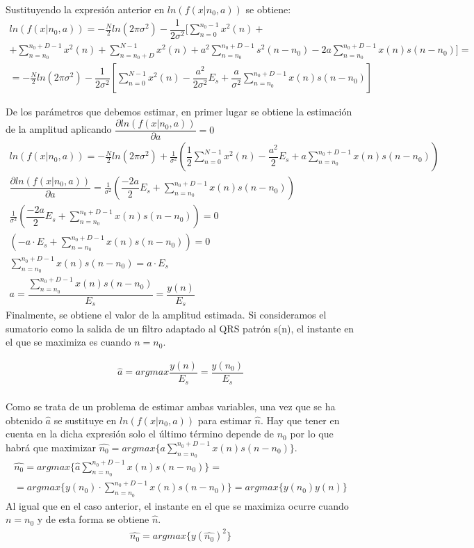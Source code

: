 \documentclass[12pt]{article}
\begin{document}
Sustituyendo la expresión anterior en $ln(f(x|n_0,a))$ se obtiene:
\begin{gather*}
ln(f(x|n_0,a)) = - \frac{N}{2}ln(2\pi\sigma^2) -\dfrac{1}{2\sigma^2} [ \sum_{n=0}^{n_0-1}x^2(n) + \\
+\sum_{n=n_0}^{n_0+D-1}x^2(n) + \sum_{n=n_0+D}^{N-1}x^2(n) + a^2\sum_{n=n_0}^{n_0+D-1}s^2(n-n_0) - 2a\sum_{n=n_0}^{n_0+D-1}x(n)s(n-n_0) ] =\\
=- \frac{N}{2}ln(2\pi\sigma^2) - \dfrac{1}{2\sigma ^2} \left[ \sum_{n=0}^{N-1}x^2(n) - \dfrac{a^2}{2\sigma^2}E_s + \dfrac{a}{\sigma^2}\sum_{n=n_0}^{n_0+D-1}x(n)s(n-n_0)\right] 
\end{gather*}

De los parámetros que debemos estimar, en primer lugar se obtiene la estimación de la amplitud aplicando $\dfrac{\partial ln(f(x|n_0,a))}{\partial a} = 0$
\begin{gather*}
ln(f(x|n_0,a)) = - \frac{N}{2}ln(2\pi\sigma^2) + \frac{1}{\sigma^2} \left( \dfrac{1}{2}\sum_{n=0}^{N-1}x^2(n) -\dfrac{a^2}{2}E_s
+a\sum_{n=n_0}^{n_0+D-1}x(n)s(n-n_0) \right) \\ 
\dfrac{\partial ln(f(x|n_0,a))}{\partial a} = \frac{1}{\sigma^2} \left( \dfrac{-2a}{2} E_s + \sum_{n=n_0}^{n_0+D-1}x(n)s(n-n_0) \right)\\
\frac{1}{\sigma^2} \left( \dfrac{-2a}{2} E_s + \sum_{n=n_0}^{n_0+D-1}x(n)s(n-n_0) \right) =0\\
\left( -a\cdot E_s + \sum_{n=n_0}^{n_0+D-1}x(n)s(n-n_0) \right) =0\\	
\sum_{n=n_0}^{n_0+D-1}x(n)s(n-n_0) = a\cdot E_s\\
a= \dfrac{\sum_{n=n_0}^{n_0+D-1}x(n)s(n-n_0)}{E_s} = \dfrac{y(n)}{E_s}
\end{gather*}
Finalmente, se obtiene el valor de la amplitud estimada. Si consideramos el sumatorio como la salida de un filtro adaptado al QRS patrón s(n), el instante en el que se maximiza es cuando $n=n_0$.

\begin{gather*}
\hat{a} = argmax{\dfrac{y(n)}{E_s}}=\dfrac{y(n_0)}{E_s}
\end{gather*}
\\

Como se trata de un problema de estimar ambas variables, una vez que se ha obtenido $\hat{a}$ se sustituye en $ln(f(x|n_0,a))$ para estimar $\hat{n}$. Hay que tener en cuenta en la dicha expresión solo el último término depende de $n_0$ por lo que habrá que maximizar $\hat{n_0}= argmax\{ a\sum_{n=n_0}^{n_0+D-1}x(n)s(n-n_0) \}$.
\begin{gather*}
\hat{n_0} = argmax\{ \hat{a}\sum_{n=n_0}^{n_0+D-1}x(n)s(n-n_0) \} = \\
=argmax\{ y(n_0) \cdot \sum_{n=n_0}^{n_0+D-1}x(n)s(n-n_0) \}
=argmax\{y(n_0) y(n)\}
\end{gather*}
Al igual que en el caso anterior, el instante en el que se maximiza ocurre cuando $n=n_0$ y de esta forma se obtiene $\hat{n}$.
\begin{gather*}
\hat{n_0} = argmax\{y(\hat{n_0})^2\}
\end{gather*}
\end{document}
